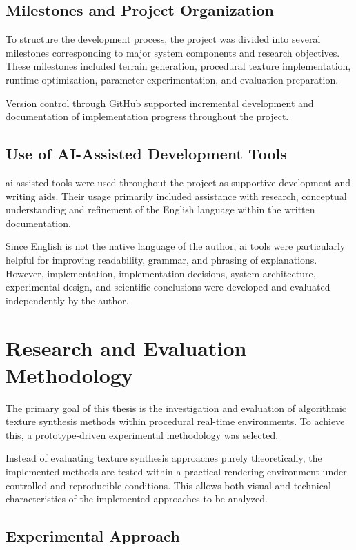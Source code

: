 \subsection{Milestones and Project Organization}

To structure the development process, the project was divided into several milestones corresponding to major system components and research objectives. These milestones included terrain generation, procedural texture implementation, runtime optimization, parameter experimentation, and evaluation preparation.

Version control through GitHub supported incremental development and documentation of implementation progress throughout the project.

\subsection{Use of AI-Assisted Development Tools}

\gls{ai}-assisted tools were used throughout the project as supportive development and writing aids. Their usage primarily included assistance with research, conceptual understanding and refinement of the English language within the written documentation.

Since English is not the native language of the author, \gls{ai} tools were particularly helpful for improving readability, grammar, and phrasing of explanations. However, implementation, implementation decisions, system architecture, experimental design, and scientific conclusions were developed and evaluated independently by the author.

\section{Research and Evaluation Methodology}

The primary goal of this thesis is the investigation and evaluation of algorithmic texture synthesis methods within procedural real-time environments. To achieve this, a prototype-driven experimental methodology was selected.

Instead of evaluating texture synthesis approaches purely theoretically, the implemented methods are tested within a practical rendering environment under controlled and reproducible conditions. This allows both visual and technical characteristics of the implemented approaches to be analyzed.

\subsection{Experimental Approach}

